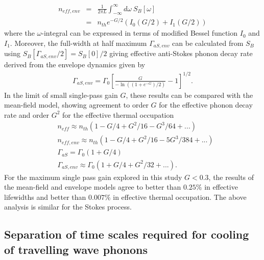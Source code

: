\begin{eqnarray}
 n_{eff,env} & = & \frac{1}{2\pi L}\int_{-\infty}^{\infty} d \omega \ S_B[\omega]
 \\
 & = & n_{th} e^{-G/2}(I_0(G/2) + I_1(G/2))
\end{eqnarray}
where the $\omega$-integral can be expressed in terms of modified Bessel function $I_0$ and $I_1$. Moreover, the full-width at half maximum $\Gamma_{aS,env}$ can be calculated from $S_B$ using $S_B[\Gamma_{aS,env}/2]= S_B[0]/2$ giving effective anti-Stokes phonon decay rate derived from the envelope dynamics given by
\begin{eqnarray}
    \Gamma_{aS,env} = \Gamma_0\left[ \frac{G}{-\ln\left((1+e^{-G})/2\right)}-1 \right]^{1/2}.
\end{eqnarray}
In the limit of small single-pass gain $G$, these results can be compared with the mean-field model, showing agreement to order $G$ for the effective phonon decay rate and order $G^2$ for the effective thermal occupation
\begin{align}
& \!\!\!\! n_{eff}  \approx n_{th}(1-G/4+G^2/16- G^3/64 + ...) \\
& \!\!\!\! n_{eff,env}   \approx  n_{th}(1-G/4+G^2/16- 5G^3/384 + ...)  \\
& \!\!\!\! \Gamma_{aS}  =  \Gamma_0(1+G/4) \\
& \!\!\!\! \Gamma_{aS,env}  \approx  \Gamma_0(1+G/4+G^2/32+...).
\end{align}
    For the maximum single pass gain explored in this study $G < 0.3$, the results of the mean-field and envelope models agree to better than $0.25 \%$ in effective lifewidths and better than $0.007\%$ in effective thermal occupation. The above analysis is similar for the Stokes process.

\subsection{Separation of time scales required for cooling of travelling wave phonons}

